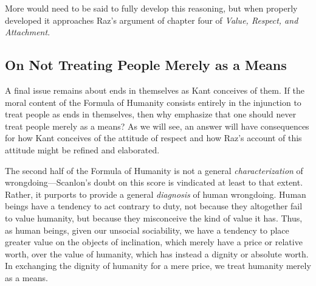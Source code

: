 \documentclass[a4paper,12pt]{article}
\begin{document}
More would need to be said to fully develop this reasoning, but when properly developed it approaches Raz's argument of chapter four of \emph{Value, Respect, and Attachment}. 


\subsection{On Not Treating People Merely as a Means} \label{sub:on_not_treating_people_merely_as_a_means} %

A final issue remains about ends in themselves as Kant conceives of them. If the moral content of the Formula of Humanity consists entirely in the injunction to treat people as ends in themselves, then why emphasize that one should never treat people merely as a means? As we will see, an answer will have consequences for how Kant conceives of the attitude of respect and how Raz's account of this attitude might be refined and elaborated.

The second half of the Formula of Humanity is not a general \emph{characterization} of wrongdoing---Scanlon's doubt on this score is vindicated at least to that extent. Rather, it purports to provide a general \emph{diagnosis} of human wrongdoing. Human beings have a tendency to act contrary to duty, not because they altogether fail to value humanity, but because they misconceive the kind of value it has. Thus, as human beings, given our unsocial sociability, we have a tendency to place greater value on the objects of inclination, which merely have a price or relative worth, over the value of humanity, which has instead a dignity or absolute worth. In exchanging the dignity of humanity for a mere price, we treat humanity merely as a means.
\end{document}
